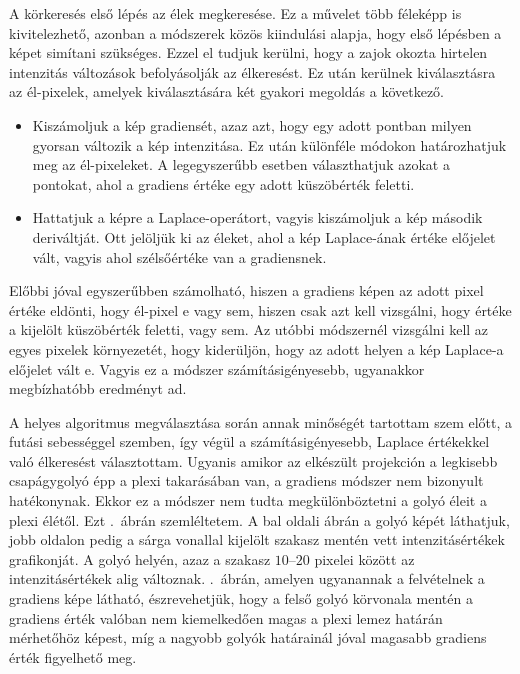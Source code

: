 \documentclass[a4paper,12pt]{article}
\begin{document}
A körkeresés  első lépés az élek megkeresése. Ez a művelet több féleképp is kivitelezhető, azonban a módszerek közös kiindulási alapja, hogy első lépésben a képet simítani szükséges. Ezzel el tudjuk kerülni, hogy a zajok okozta hirtelen intenzitás változások befolyásolják az élkeresést. Ez után kerülnek kiválasztásra az él-pixelek, amelyek kiválasztására  két gyakori megoldás a következő.

\begin{itemize}
\item Kiszámoljuk a kép gradiensét, azaz azt, hogy egy adott pontban milyen gyorsan változik a kép intenzitása. Ez után különféle módokon határozhatjuk meg az él-pixeleket. A legegyszerűbb esetben választhatjuk azokat a pontokat, ahol a gradiens értéke egy adott küszöbérték feletti.

\item Hattatjuk a képre a Laplace-operátort, vagyis kiszámoljuk a kép második deriváltját. Ott jelöljük ki az éleket, ahol a kép Laplace-ának  értéke előjelet vált, vagyis ahol szélsőértéke van a gradiensnek.

\end{itemize}

Előbbi jóval egyszerűbben számolható, hiszen a gradiens képen az adott pixel értéke eldönti, hogy él-pixel e vagy sem, hiszen csak azt kell vizsgálni, hogy értéke a kijelölt küszöbérték feletti, vagy sem. Az utóbbi módszernél vizsgálni kell az egyes pixelek környezetét, hogy kiderüljön, hogy az adott helyen a kép Laplace-a előjelet vált e. Vagyis ez a módszer számításigényesebb, ugyanakkor megbízhatóbb eredményt ad.

A helyes algoritmus megválasztása során annak minőségét tartottam szem előtt, a futási sebességgel szemben, így végül a számításigényesebb, Laplace értékekkel való  élkeresést választottam. Ugyanis amikor az elkészült projekción a  legkisebb csapágygolyó épp a plexi takarásában van, a gradiens módszer nem bizonyult hatékonynak. Ekkor ez a módszer nem tudta megkülönböztetni a golyó éleit a plexi élétől. Ezt .~ábrán szemléltetem. A bal oldali ábrán a golyó képét láthatjuk, jobb oldalon pedig a sárga vonallal kijelölt szakasz mentén vett intenzitásértékek grafikonját. A golyó helyén, azaz a szakasz $10$--$20$ pixelei között az intenzitásértékek alig változnak.    .~ábrán, amelyen ugyanannak a felvételnek a gradiens képe látható, észrevehetjük, hogy a felső golyó körvonala mentén a gradiens érték valóban nem kiemelkedően magas a plexi lemez határán mérhetőhöz képest, míg a nagyobb golyók határainál jóval magasabb gradiens érték figyelhető meg.  
\end{document}

